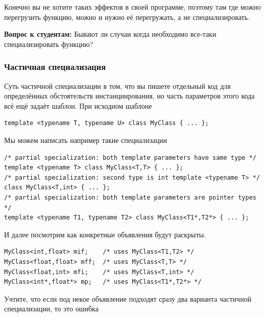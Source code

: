 \documentclass[a4paper,12pt,oneside]{article}
\newif\ifanswers
\begin{document}
Конечно вы не хотите таких эффектов в своей программе, поэтому там где можно перегрузить функцию, можно и нужно её перегружать, а не специализировать.

\textbf{Вопрос к студентам:} Бывают ли случаи когда необходимо все-таки специализировать функцию?

\ifanswers
Правильный ответ следует из предыдущего параграфа: это как раз те случаи, когда её \textbf{нельзя} перегрузить. Например стандарт регламентирует, что перегрузка функций из пространства имен \lstinline!std! запрещена, но часто хочется \lstinline!std::swap! для своих типов, в этом случае специализация -- единственный выход.
\fi

\subsubsection{Частичная специализация}\label{PartialSpec}

Суть частичной специализации в том, что вы пишете отдельный код для определённых обстоятельств инстанциирования, но часть параметров этого кода всё ещё задаёт шаблон. При исходном шаблоне

\begin{lstlisting}
template <typename T, typename U> class MyClass { ... };
\end{lstlisting}

Мы можем написать например такие специализации

\begin{lstlisting}
/* partial specialization: both template parameters have same type */ 
template <typename T> class MyClass<T,T> { ... }; 
/* partial specialization: second type is int template <typename T> */ 
class MyClass<T,int> { ... }; 
/* partial specialization: both template parameters are pointer types */
template <typename T1, typename T2> class MyClass<T1*,T2*> { ... };
\end{lstlisting}

И далее посмотрим как конкретные объявления будут раскрыты.

\begin{lstlisting}
MyClass<int,float> mif;    /* uses MyClass<T1,T2> */ 
MyClass<float,float> mff;  /* uses MyClass<T,T> */ 
MyClass<float,int> mfi;    /* uses MyClass<T,int> */ 
MyClass<int*,float*> mp;   /* uses MyClass<T1*,T2*> */
\end{lstlisting}

Учтите, что если под некое объявление подходят сразу два варианта частичной специализации, то это ошибка
\end{document}
